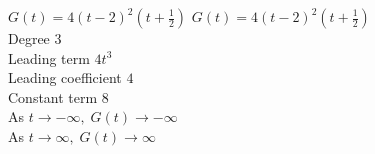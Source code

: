 {$G(t) = 4(t-2)^2\left(t+\frac{1}{2}\right)$}
{$G(t) = 4(t-2)^2\left(t+\frac{1}{2}\right)$ \\
Degree 3 \\
Leading term $4t^3$\\
Leading coefficient $4$\\
Constant term $8$\\
As $t \rightarrow -\infty, \; G(t) \rightarrow -\infty$\\
As $t \rightarrow \infty, \; G(t) \rightarrow \infty$}